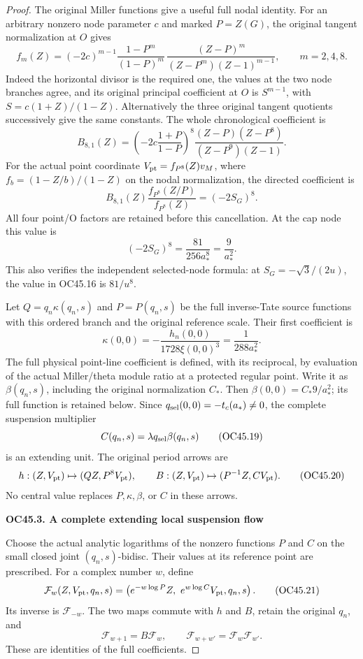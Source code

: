 \begin{proof}
The original Miller functions give a useful full nodal identity.
For an arbitrary nonzero node parameter \(c\) and marked
\(P=Z(G)\), the original tangent normalization at \(O\) gives
\[
 f_m(Z)=(-2c)^{m-1}\frac{1-P^m}{(1-P)^m}\,
       \frac{(Z-P)^m}{(Z-P^m)(Z-1)^{m-1}},
       \qquad m=2,4,8.
 \tag{OC45.14}
\]
Indeed the horizontal divisor is the required one, the values
at the two node branches agree, and its original principal
coefficient at \(O\) is \(S^{m-1}\), with
\(S=c(1+Z)/(1-Z)\). Alternatively the three original tangent
quotients successively give the same constants.
The whole chronological coefficient is
\[
 B_{8,1}(Z)=
  \left(-2c\frac{1+P}{1-P}\right)^8
  \frac{(Z-P)(Z-P^8)}{(Z-P^9)(Z-1)}.
 \tag{OC45.15}
\]
For the actual point coordinate
\(V_{\rm pt}=f_{P^8}(Z)v_M\),
where \(f_b=(1-Z/b)/(1-Z)\) on the nodal normalization,
the directed coefficient is
\[
 B_{8,1}(Z)\frac{f_{P^8}(Z/P)}{f_{P^8}(Z)}
       =(-2S_G)^8.
 \tag{OC45.16}
\]
All four point/O factors are retained before this cancellation.
At the cap node this value is
\[
 (-2S_G)^8=\frac{81}{256a_*^8}=\frac9{a_*^2}.
 \tag{OC45.17}
\]
This also verifies the independent selected-node formula:
at \(S_G=-\sqrt3/(2u)\), the value in OC45.16 is \(81/u^8\).

Let \(Q=q_n\kappa(q_n,s)\) and \(P=P(q_n,s)\) be the full
inverse-Tate source functions with this ordered branch and
the original reference scale. Their first coefficient is
\[
 \kappa(0,0)
   =-\frac{h_n(0,0)}{1728\xi(0,0)^3}
   =\frac1{288a_*^2}.
 \tag{OC45.18}
\]
The full physical point-line coefficient is defined, with
its reciprocal, by evaluation of the actual Miller/theta
module ratio at a protected regular point. Write it as
\(\beta(q_n,s)\), including the original normalization
\(C_*\). Then \(\beta(0,0)=C_*9/a_*^2\); its full function
is retained below. Since \(q_{\rm sel}(0,0)=-t_c(a_*)\ne0\),
the complete suspension multiplier
\[
 C(q_n,s)=\lambda q_{\rm sel}\beta(q_n,s)
 \tag{OC45.19}
\]
is an extending unit. The original period arrows are
\[
 h:(Z,V_{\rm pt})\mapsto(QZ,P^8V_{\rm pt}),\qquad
 B:(Z,V_{\rm pt})\mapsto(P^{-1}Z,CV_{\rm pt}).
 \tag{OC45.20}
\]
No central value replaces \(P,\kappa,\beta\), or \(C\) in
these arrows.

\par

\medskip\noindent\textbf{OC45.3. A complete extending local suspension flow}

\par\nobreak

Choose the actual analytic logarithms of the nonzero
functions \(P\) and \(C\) on the small closed joint
\((q_n,s)\)-bidisc. Their values at its reference point
are prescribed. For a complex number \(w\), define
\[
 \mathcal F_w(Z,V_{\rm pt},q_n,s)
   =\left(e^{-w\log P}Z,\ e^{w\log C}V_{\rm pt},q_n,s\right).
 \tag{OC45.21}
\]
Its inverse is \(\mathcal F_{-w}\). The two maps commute
with \(h\) and \(B\), retain the original \(q_n\), and
\[
 \mathcal F_{w+1}=B\mathcal F_w,\qquad
 \mathcal F_{w+w'}=\mathcal F_w\mathcal F_{w'}.
 \tag{OC45.22}
\]
These are identities of the full coefficients.


\end{proof}
